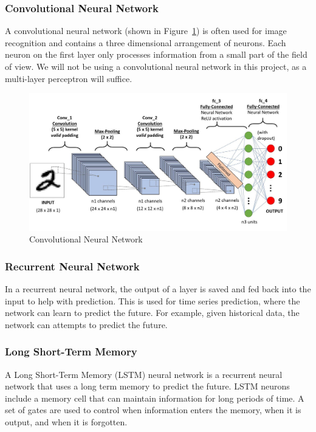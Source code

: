 \documentclass[titlepage]{article}
\begin{document}
\subsubsection{Convolutional Neural Network}
A convolutional neural network\cite{convolutionalnn} (shown in Figure~\ref{fig:convolutional_neural_network}) is often used for image recognition and contains a three dimensional arrangement of neurons. Each neuron on the first layer only processes information from a small part of the field of view. We will not be using a convolutional neural network in this project, as a multi-layer perceptron will suffice.

\begin{figure}[h!]
    \includegraphics[width=\textwidth]{./assets/convolutional2.jpeg}
    \caption{Convolutional Neural Network}
    \label{fig:convolutional_neural_network}
\end{figure}

\subsubsection{Recurrent Neural Network}
In a recurrent neural network, the output of a layer is saved and fed back into the input to help with prediction. This is used for time series prediction, where the network can learn to predict the future. For example, given historical data, the network can attempts to predict the future.

\subsubsection{Long Short-Term Memory}
A Long Short-Term Memory (LSTM) neural network is a recurrent neural network that uses a long term memory to predict the future. LSTM neurons include a memory cell that can maintain information for long periods of time. A set of gates are used to control when information enters the memory, when it is output, and when it is forgotten.
\end{document}

